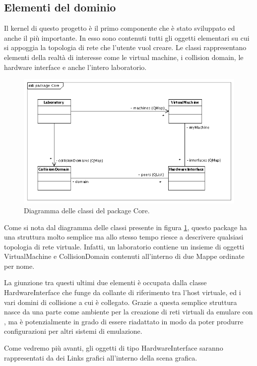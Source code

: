 \subsection{Elementi del dominio}
Il kernel di questo progetto è il primo componente che è stato sviluppato ed anche il più importante. In esso sono contenuti tutti gli oggetti elementari su cui si appoggia la topologia di rete che l'utente vuol creare. Le classi rappresentano elementi della realtà di interesse come le virtual machine, i collision domain, le hardware interface e anche l'intero laboratorio.

\begin{figure}[!htb]
	\centering
	\includegraphics[width=12cm]{images/uml_package_core.png}
	\caption{Diagramma delle classi del package Core.}
	\label{figura:uml_package_core}
\end{figure}

Come si nota dal diagramma delle classi presente in figura \ref{figura:uml_package_core}, questo package ha una struttura molto semplice ma allo stesso tempo riesce a descrivere qualsiasi topologia di rete virtuale. Infatti, un laboratorio contiene un insieme di oggetti VirtualMachine e CollisionDomain contenuti all'interno di due Mappe ordinate per nome.

La giunzione tra questi ultimi due elementi è occupata dalla classe HardwareInterface che funge da collante di riferimento tra l'host virtuale, ed i vari domini di collisione a cui è collegato.
Grazie a questa semplice struttura \visualnetkit{} nasce da una parte come ambiente per la creazione di reti virtuali da emulare con \netkit{}, ma è potenzialmente in grado di essere riadattato in modo da poter produrre configurazioni per altri sistemi di emulazione.

Come vedremo più avanti, gli oggetti di tipo HardwareInterface saranno rappresentati da dei Links grafici all'interno della scena grafica.

